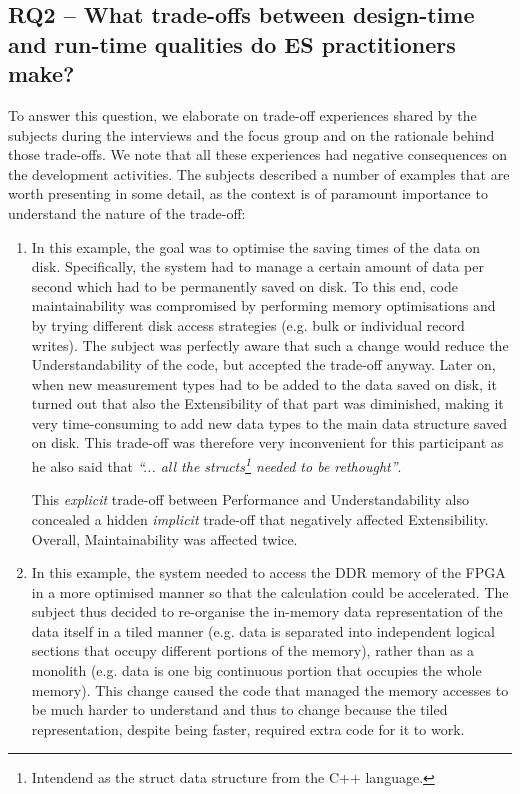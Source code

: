 \subsection{RQ2 -- What trade-offs between design-time and run-time qualities do ES practitioners make?}
To answer this question, we elaborate on trade-off experiences shared by the subjects during the interviews and the focus group and on the rationale behind those trade-offs. We note that all these experiences had negative consequences on the development activities. The subjects described a number of examples that are worth presenting in some detail, as the context is of paramount importance to understand the nature of the trade-off:
\begin{enumerate}
    \item In this example, the goal was to optimise the saving times of the data on disk. Specifically, the system had to manage a certain amount of data per second which had to be permanently saved on disk.
    To this end, code maintainability was compromised by performing memory optimisations and by trying different disk access strategies (e.g. bulk or individual record writes).
    The subject was perfectly aware that such a change would reduce the Understandability of the code, but accepted the trade-off anyway.
    Later on, when new measurement types had to be added to the data saved on disk, it turned out that also the Extensibility of that part was diminished, making it very time-consuming to add new data types to the main data structure saved on disk. This trade-off was therefore very inconvenient for this participant as he also said that \textit{``... all the structs\footnote{Intendend as the struct data structure from the C++ language.} needed to be rethought''}.

    This \textit{explicit} trade-off between Performance and Understandability also concealed a hidden \textit{implicit} trade-off that negatively affected Extensibility. 
    Overall, Maintainability was affected twice.

    \item In this example, the system needed to access the DDR memory of the FPGA in a more optimised manner so that the calculation could be accelerated. The subject thus decided to re-organise the in-memory data representation of the data itself in a tiled manner (e.g. data is separated into independent logical sections that occupy different portions of the memory), rather than as a monolith (e.g. data is one big continuous portion that occupies the whole memory). 
    This change caused the code that managed the memory accesses to be much harder to understand and thus to change because the tiled representation, despite being faster, required extra code for it to work.


\end{enumerate}
